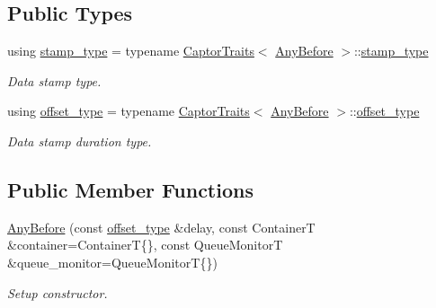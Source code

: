 \subsection*{Public Types}
\begin{DoxyCompactItemize}
\item 
\mbox{\label{classflow_1_1follower_1_1_any_before_a314362d61e731cdffefbcbf0e12dd6d8}} 
using \hyperlink{classflow_1_1follower_1_1_any_before_a314362d61e731cdffefbcbf0e12dd6d8}{stamp\+\_\+type} = typename \hyperlink{structflow_1_1_captor_traits}{Captor\+Traits}$<$ \hyperlink{classflow_1_1follower_1_1_any_before}{Any\+Before} $>$\+::\hyperlink{classflow_1_1follower_1_1_any_before_a314362d61e731cdffefbcbf0e12dd6d8}{stamp\+\_\+type}
\begin{DoxyCompactList}\small\item\em Data stamp type. \end{DoxyCompactList}\item 
\mbox{\label{classflow_1_1follower_1_1_any_before_aee1b47d081b0b242b5fddabcd2c5310c}} 
using \hyperlink{classflow_1_1follower_1_1_any_before_aee1b47d081b0b242b5fddabcd2c5310c}{offset\+\_\+type} = typename \hyperlink{structflow_1_1_captor_traits}{Captor\+Traits}$<$ \hyperlink{classflow_1_1follower_1_1_any_before}{Any\+Before} $>$\+::\hyperlink{classflow_1_1follower_1_1_any_before_aee1b47d081b0b242b5fddabcd2c5310c}{offset\+\_\+type}
\begin{DoxyCompactList}\small\item\em Data stamp duration type. \end{DoxyCompactList}\end{DoxyCompactItemize}
\subsection*{Public Member Functions}
\begin{DoxyCompactItemize}
\item 
\hyperlink{classflow_1_1follower_1_1_any_before_a68131a41e3c0ce8ae050b39080c57371}{Any\+Before} (const \hyperlink{classflow_1_1follower_1_1_any_before_aee1b47d081b0b242b5fddabcd2c5310c}{offset\+\_\+type} \&delay, const ContainerT \&container=ContainerT\{\}, const Queue\+MonitorT \&queue\+\_\+monitor=Queue\+MonitorT\{\})
\begin{DoxyCompactList}\small\item\em Setup constructor. \end{DoxyCompactList}\end{DoxyCompactItemize}

